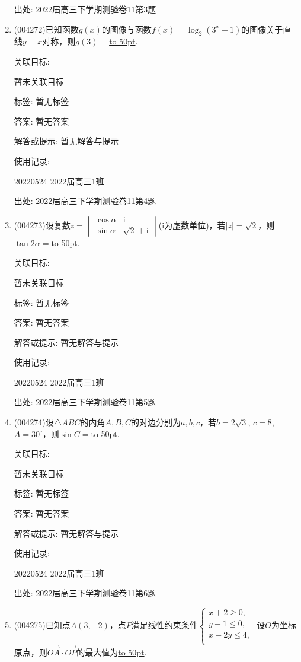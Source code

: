 \documentclass[10pt,a4paper]{article}
\newcommand{\blank}[1]{\underline{\hbox to #1pt{}}}
\begin{document}
\begin{enumerate}[1.]
出处: 2022届高三下学期测验卷11第3题
\item { (004272)}已知函数$g(x)$的图像与函数$f(x)=\log_2(3^x-1)$的图像关于直线$y=x$对称，则$g(3)=$\blank{50}.


关联目标:

暂未关联目标



标签: 暂无标签

答案: 暂无答案

解答或提示: 暂无解答与提示

使用记录:

20220524	2022届高三1班	


出处: 2022届高三下学期测验卷11第4题
\item { (004273)}设复数$z=\begin{vmatrix}   \cos \alpha  & \mathrm{i}  \\
\sin \alpha  & \sqrt{2}+\mathrm{i}\end{vmatrix}$($\mathrm{i}$为虚数单位)，若$|z|=\sqrt{2}$，则$\tan 2\alpha=$\blank{50}.


关联目标:

暂未关联目标



标签: 暂无标签

答案: 暂无答案

解答或提示: 暂无解答与提示

使用记录:

20220524	2022届高三1班	


出处: 2022届高三下学期测验卷11第5题
\item { (004274)}设$\triangle ABC$的内角$A,B,C$的对边分别为$a,b,c$，若$b=2\sqrt{3}$, $c=8$, $A=30^\circ$，则$\sin C=$\blank{50}.


关联目标:

暂未关联目标



标签: 暂无标签

答案: 暂无答案

解答或提示: 暂无解答与提示

使用记录:

20220524	2022届高三1班	


出处: 2022届高三下学期测验卷11第6题
\item { (004275)}已知点$A(3,-2)$，点$P$满足线性约束条件$\begin{cases}  x+2\ge 0,  \\   y-1\le 0,  \\   x-2y\le 4,  \\ \end{cases}$ 设$O$为坐标原点，则$\overrightarrow{OA}\cdot \overrightarrow{OP}$的最大值为\blank{50}.



\end{enumerate}
\end{document}
